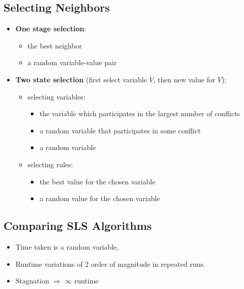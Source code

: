 \documentclass{article}
\begin{document}
\subsection{Selecting Neighbors}

\begin{itemize}
    \item \textbf{One stage selection}:
        \begin{itemize}
            \item the best neighbor
            \item a random variable-value pair
        \end{itemize}
    \item \textbf{Two state selection} (first select variable $V$, then new value for $V$):
        \begin{itemize}
            \item selecting variables:
                \begin{itemize}
                    \item the variable which participates in the largest number of conflicts
                    \item a random variable that participates in some conflict
                    \item a random variable
                \end{itemize}
            \item selecting rules:
                \begin{itemize}
                    \item the best value for the chosen variable
                    \item a random value for the chosen variable
                \end{itemize}
        \end{itemize}
\end{itemize}

\subsection{Comparing SLS Algorithms}

\begin{itemize}
    \item Time taken is a random variable.
    \item Runtime variations of 2 order of magnitude in repeated runs.
    \item Stagnation $\Rightarrow$ $\infty$ runtime
\end{itemize}
\end{document}
